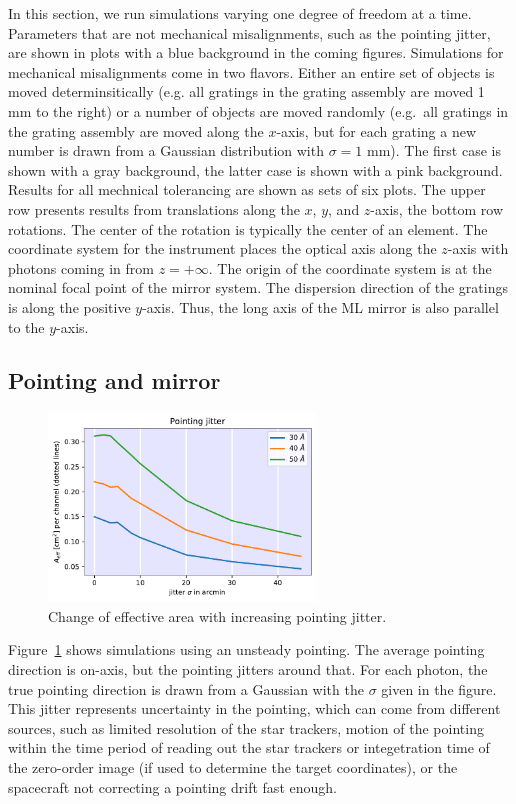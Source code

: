 \documentclass[]{spie}  %
\begin{document}
In this section, we run simulations varying one degree of freedom at a
time. Parameters that are not mechanical misalignments, such as the
pointing jitter, are shown in plots with a blue background in the
coming figures. Simulations for mechanical misalignments come in two
flavors. Either an entire set of objects is moved determinsitically
(e.g. all gratings in the grating assembly are moved 1 mm to the
right) or a number of objects are moved randomly (e.g.\ all gratings in
the grating assembly are moved along the $x$-axis, but for each
grating a new number is drawn from a Gaussian distribution with
$\sigma=1$ mm). The first case is shown with a gray background, the
latter case is shown with a pink background. Results for all mechnical
tolerancing are shown as sets of six plots. The upper row presents
results from translations along the $x$, $y$, and $z$-axis, the bottom
row rotations. The center of the rotation is typically the center of
an element. The coordinate system for the instrument places the optical axis
along the $z$-axis with photons coming in from $z=+\infty$. The origin
of the coordinate system is at the nominal focal point of the mirror
system. The dispersion direction of the gratings is along the positive
$y$-axis. Thus, the long axis of the ML mirror is also parallel to the
$y$-axis.

\subsection{Pointing and mirror}
\begin{figure} [ht]
  \begin{center}
    \includegraphics[height=5cm]{jitter.pdf}
  \end{center}
  \caption
      { \label{fig:jitter}Change of effective area with increasing pointing jitter. 
}
\end{figure}

Figure~\ref{fig:jitter} shows simulations using an unsteady
pointing. The average pointing direction is on-axis, but the pointing
jitters around that. For each photon, the true pointing direction is
drawn from a Gaussian with the $\sigma$ given in the figure. This
jitter represents uncertainty in the pointing, which can come from
different sources, such as limited resolution of the star trackers,
motion of the pointing within the time period of reading out the star
trackers or integetration time of the zero-order image (if used to
determine the target coordinates), or the spacecraft not correcting a
pointing drift fast enough.
\end{document}
